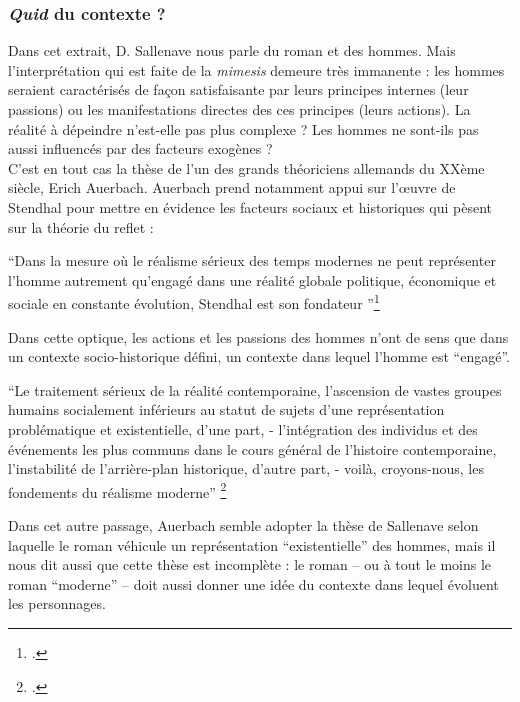 \documentclass[a4paper,10pt]{article}
\begin{document}
				
			\subsubsection{\textit{Quid} du contexte ?}
				Dans cet extrait, D. Sallenave nous parle du roman et des hommes. Mais l'interprétation qui est faite de la \textit{mimesis} demeure très immanente : les hommes seraient caractérisés de façon satisfaisante par leurs principes internes (leur  passions) ou les manifestations directes des ces principes (leurs actions). La réalité à dépeindre n'est-elle pas plus complexe ? Les hommes ne sont-ils pas aussi influencés par des facteurs exogènes ?\\
				C'est en tout cas la thèse de l'un des grands théoriciens allemands du XXème siècle, Erich Auerbach. Auerbach\cite{Auerbach1946} prend notamment appui sur l'œuvre de Stendhal pour mettre en évidence les facteurs sociaux et historiques qui pèsent sur la théorie du reflet :
				\begin{center}
					\footnotesize
					\begin{minipage}{0.7\textwidth}
						``Dans la mesure où le réalisme sérieux des temps modernes ne peut représenter l’homme autrement qu’engagé dans une réalité globale
						politique, économique et sociale en constante évolution, Stendhal est son fondateur ''\footcite[p.~459]{Auerbach1946}
					\end{minipage}
				\end{center}
				Dans cette optique, les actions et les passions des hommes n'ont de sens que dans un contexte socio-historique défini, un contexte dans lequel l'homme est ``engagé''.
				\begin{center}
					\footnotesize
					\begin{minipage}{0.7\textwidth}
						``Le traitement sérieux de la réalité contemporaine, l’ascension de vastes groupes humains socialement inférieurs au statut de sujets d’une représentation problématique et
						existentielle, d’une part, - l’intégration des individus et des événements les plus communs
						dans le cours général de l’histoire contemporaine, l’instabilité de l’arrière-plan historique,
						d’autre part, - voilà, croyons-nous, les fondements du réalisme moderne'' \footcite[p.~487]{Auerbach1946}
					\end{minipage}
				\end{center}
				Dans cet autre passage, Auerbach semble adopter la thèse de Sallenave selon laquelle le roman véhicule un représentation ``existentielle'' des hommes, mais il nous dit aussi que cette thèse est incomplète : le roman -- ou à tout le moins le roman ``moderne'' -- doit aussi donner une idée du contexte dans lequel évoluent les personnages.
		
\end{document}
